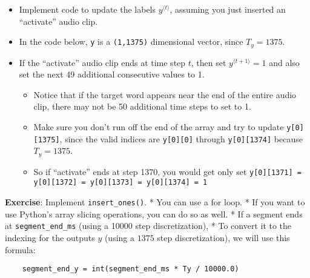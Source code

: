 \documentclass[11pt]{article}
\begin{document}
\begin{itemize}
\itemsep1pt\parskip0pt
\item
  Implement code to update the labels $y^{\langle t \rangle}$, assuming
  you just inserted an ``activate'' audio clip.
\item
  In the code below, \texttt{y} is a \texttt{(1,1375)} dimensional
  vector, since $T_y = 1375$.
\item
  If the ``activate'' audio clip ends at time step $t$, then set
  $y^{\langle t+1 \rangle} = 1$ and also set the next 49 additional
  consecutive values to 1.

  \begin{itemize}
  \itemsep1pt\parskip0pt
  \item
    Notice that if the target word appears near the end of the entire
    audio clip, there may not be 50 additional time steps to set to 1.
  \item
    Make sure you don't run off the end of the array and try to update
    \texttt{y{[}0{]}{[}1375{]}}, since the valid indices are
    \texttt{y{[}0{]}{[}0{]}} through \texttt{y{[}0{]}{[}1374{]}} because
    $T_y = 1375$.
  \item
    So if ``activate'' ends at step 1370, you would get only set
    \texttt{y{[}0{]}{[}1371{]} = y{[}0{]}{[}1372{]} = y{[}0{]}{[}1373{]} = y{[}0{]}{[}1374{]} = 1}
  \end{itemize}
\end{itemize}

\textbf{Exercise}: Implement \texttt{insert\_ones()}. * You can use a
for loop. * If you want to use Python's array slicing operations, you
can do so as well. * If a segment ends at \texttt{segment\_end\_ms}
(using a 10000 step discretization), * To convert it to the indexing for
the outputs $y$ (using a $1375$ step discretization), we will use this
formula:

\begin{verbatim}
    segment_end_y = int(segment_end_ms * Ty / 10000.0)
\end{verbatim}
\end{document}
